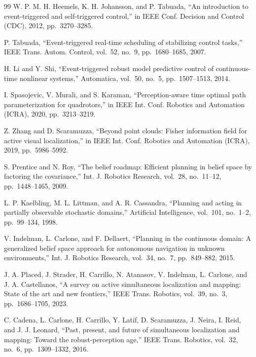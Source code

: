 \documentclass[letterpaper, 10 pt, conference]{ieeeconf}  %
\begin{document}
\begin{thebibliography}{99}
 W. P. M. H. Heemels, K. H. Johansson, and P. Tabuada,
``An introduction to event-triggered and self-triggered control,'' in {IEEE Conf.
Decision and Control (CDC)}, 2012, pp.~3270--3285.

 P. Tabuada, ``Event-triggered real-time scheduling of stabilizing
control tasks,'' {IEEE Trans. Autom. Control}, vol.~52, no.~9, pp.~1680--1685, 2007.

 H. Li and Y. Shi, ``Event-triggered robust model predictive control of
continuous-time nonlinear systems,'' {Automatica}, vol.~50, no.~5, pp.~1507--1513, 2014.

 I. Spasojevic, V. Murali, and S. Karaman,
``Perception-aware time optimal path parameterization for quadrotors,'' in {IEEE Int.
Conf. Robotics and Automation (ICRA)}, 2020, pp.~3213--3219.

 Z. Zhang and D. Scaramuzza, ``Beyond point clouds: Fisher information
field for active visual localization,'' in {IEEE Int. Conf. Robotics and Automation
(ICRA)}, 2019, pp.~5986--5992.

 S. Prentice and N. Roy, ``The belief roadmap: Efficient planning
in belief space by factoring the covariance,'' {Int. J. Robotics Research}, vol.~28,
no.~11--12, pp.~1448--1465, 2009.

 L. P. Kaelbling, M. L. Littman, and A. R. Cassandra,
``Planning and acting in partially observable stochastic domains,'' {Artificial
Intelligence}, vol.~101, no.~1--2, pp.~99--134, 1998.

 V. Indelman, L. Carlone, and F. Dellaert, ``Planning in the
continuous domain: A generalized belief space approach for autonomous navigation in unknown
environments,'' {Int. J. Robotics Research}, vol.~34, no.~7, pp.~849--882, 2015.

 J. A. Placed, J. Strader, H. Carrillo, N. Atanasov, V. Indelman,
L. Carlone, and J. A. Castellanos, ``A survey on active simultaneous localization and mapping:
State of the art and new frontiers,'' {IEEE Trans. Robotics}, vol.~39, no.~3,
pp.~1686--1705, 2023.

 C. Cadena, L. Carlone, H. Carrillo, Y. Latif, D. Scaramuzza, J. Neira,
I. Reid, and J. J. Leonard, ``Past, present, and future of simultaneous localization and
mapping: Toward the robust-perception age,'' {IEEE Trans. Robotics}, vol.~32, no.~6,
pp.~1309--1332, 2016.


\end{thebibliography}
\end{document}
